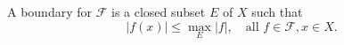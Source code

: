 
A boundary for $\mathcal{F}$ is a closed subset $E$ of $X$ such that
$$|f(x)| \leq \max_E |f|, \quad \text{all } f \in \mathcal{F}, x \in X.$$
